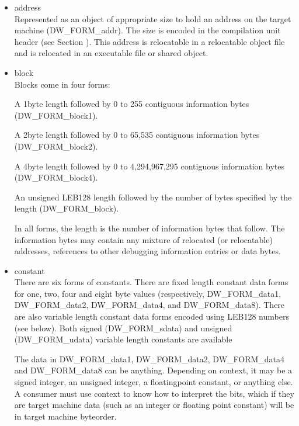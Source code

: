 \begin{itemize}
\item address \\
Represented as an object of appropriate size to hold an
address on the target machine (DW\_FORM\_addr). The size is
encoded in the compilation unit header 
(see Section ).
This address is relocatable in a relocatable object file and
is relocated in an executable file or shared object.

\item block \\
Blocks come in four forms:

\begin{myindentpara}{1cm}
A 1\dash byte length followed by 0 to 255 contiguous information
bytes (DW\_FORM\_block1).
\end{myindentpara}

\begin{myindentpara}{1cm}
A 2\dash byte length followed by 0 to 65,535 contiguous information
bytes (DW\_FORM\_block2).
\end{myindentpara}


\begin{myindentpara}{1cm}
A 4\dash byte length followed by 0 to 4,294,967,295 contiguous
information bytes (DW\_FORM\_block4).
\end{myindentpara}


\begin{myindentpara}{1cm}
An unsigned LEB128 length followed by the number of bytes
specified by the length (DW\_FORM\_block).
\end{myindentpara}

In all forms, the length is the number of information bytes
that follow. The information bytes may contain any mixture
of relocated (or relocatable) addresses, references to other
debugging information entries or data bytes.

\item constant \\
There are six forms of constants. There are fixed length
constant data forms for one, two, four and eight byte values
(respectively, DW\_FORM\_data1, DW\_FORM\_data2, DW\_FORM\_data4,
and DW\_FORM\_data8). There are also variable length constant
data forms encoded using LEB128 numbers (see below). Both
signed (DW\_FORM\_sdata) and unsigned (DW\_FORM\_udata) variable
length constants are available

The data in DW\_FORM\_data1, DW\_FORM\_data2, DW\_FORM\_data4 and
DW\_FORM\_data8 can be anything. Depending on context, it may
be a signed integer, an unsigned integer, a floating\dash point
constant, or anything else. A consumer must use context to
know how to interpret the bits, which if they are target
machine data (such as an integer or floating point constant)
will be in target machine byte\dash order.


\end{itemize}
